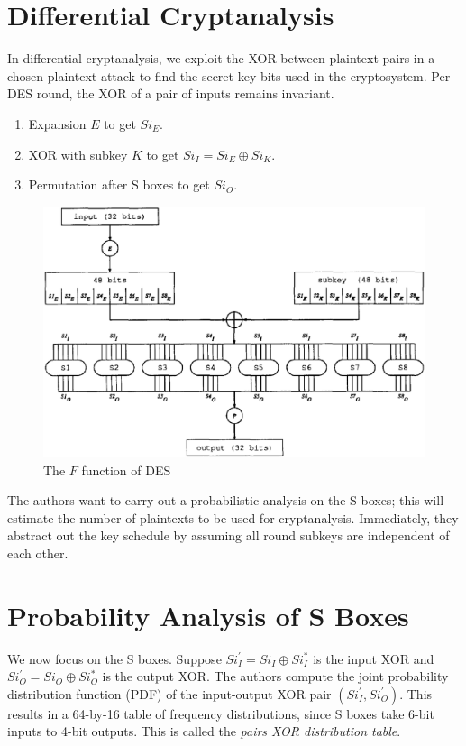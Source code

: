 \documentclass[twoside]{article}
\begin{document}



\section{Differential Cryptanalysis}
In differential cryptanalysis, we exploit the XOR between plaintext pairs in a
chosen plaintext attack to find the secret key bits used in the cryptosystem.
Per DES round, the XOR of a pair of inputs remains invariant.

\begin{enumerate}
    \item Expansion \(E\) to get \(Si_E\).
    \item XOR with subkey \(K\) to get \(Si_I = Si_E \oplus Si_K\).
    \item Permutation after S boxes to get \(Si_O\).
\end{enumerate}

\begin{figure}[!ht]
    \centering
    \includegraphics[width=0.5\linewidth]{images/des_f.png}
    \caption{The \(F\) function of DES}
    \label{fig:des-f}
\end{figure}

The authors want to carry out a probabilistic analysis on the S boxes; this will
estimate the number of plaintexts to be used for cryptanalysis. Immediately,
they abstract out the key schedule by assuming all round subkeys are independent
of each other.

\section{Probability Analysis of S Boxes}
We now focus on the S boxes. Suppose \(Si_I^\prime = Si_I \oplus Si_I^*\) is the
input XOR and \(Si_O^\prime = Si_O \oplus Si_O^*\) is the output XOR. The
authors compute the joint probability distribution function (PDF) of the
input-output XOR pair \((Si_I^\prime, Si_O^\prime)\). This results in a 64-by-16
table of frequency distributions, since S boxes take 6-bit inputs to 4-bit
outputs. This is called the \emph{pairs XOR distribution table}.
\end{document}
